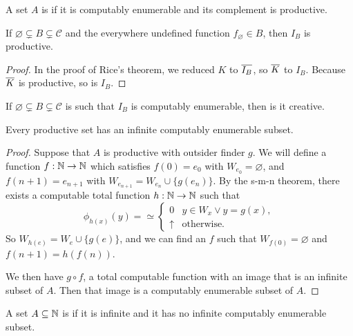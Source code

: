 \begin{definition}
  A set $A$ is  if it is computably enumerable and its
  complement is productive.
\end{definition}

\begin{theorem}
  If $\varnothing \subsetneq B \subsetneq \mathcal{C}$ and the everywhere
  undefined function $f_\varnothing \in B$, then $I_B$ is productive.
\end{theorem}

\begin{proof}
  In the proof of Rice's theorem, we reduced $K$ to $\overline{I_B}$, so $\overline{K}$ to
  $I_B$.
  Because $\overline{K}$ is productive, so is $I_B$.
\end{proof}

\begin{theorem}
  If $\varnothing \subsetneq B \subsetneq \mathcal{C}$ is such that $I_B$ is
  computably enumerable, then is it creative.
\end{theorem}

\begin{theorem}
  Every productive set has an infinite computably enumerable subset.
\end{theorem}

\begin{proof}
  Suppose that $A$ is productive with outsider finder $g$.
  We will define a function $f: \mathbb{N} \to \mathbb{N}$ which satisfies $f(0) = e_0$ with
  $W_{e_0} = \varnothing$, and $f(n+1) = e_{n+1}$ with $W_{e_{n+1}} = W_{e_n}
  \cup \{g(e_n)\}$.
  By the s-m-n theorem, there exists a computable total function $h: \mathbb{N} \to \mathbb{N}$
  such that
  \[
	\phi_{h(x)}(y) = \simeq
	\begin{cases}
	  0 & y \in W_x \lor y = g(x), \\
	  \uparrow & \text{otherwise.}
	\end{cases}
  \]
  So $W_{h(e)} = W_e \cup \{g(e)\}$, and we can find an $f$ such that $W_{f(0)}
  = \varnothing$ and $f(n+1) = h(f(n))$.

  We then have $g \circ f$, a total computable function with an image that is an
  infinite subset of $A$.
  Then that image is a computably enumerable subset of $A$.
\end{proof}

\begin{definition}
  A set $A \subseteq \mathbb{N}$ is  if it is infinite and it has no
  infinite computably enumerable subset.
\end{definition}

